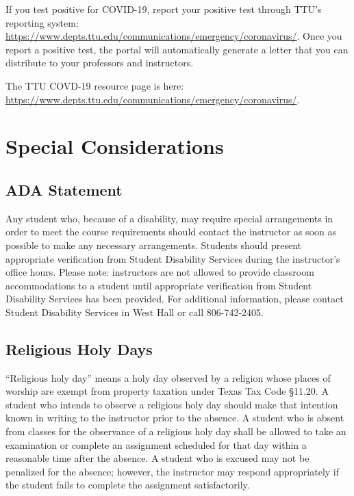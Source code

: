 \documentclass[12pt, notitlepage]{article}   	%
\begin{document}
{If you test positive for COVID-19, report your positive test through TTU's reporting system: 
\url{https://www.depts.ttu.edu/communications/emergency/coronavirus/}. Once you report a positive 
test, the portal will automatically generate a letter that you can distribute to your 
professors and instructors.

The TTU COVD-19 resource page is here: \url{https://www.depts.ttu.edu/communications/emergency/coronavirus/}.

\section{Special Considerations}
\subsection{ADA Statement}
Any student who, because of a disability, may require special arrangements in order to 
meet the course requirements should contact the instructor as soon as possible to make 
any necessary arrangements. Students should present appropriate verification from Student 
Disability Services during the instructor's office hours. Please note: instructors are 
not allowed to provide classroom accommodations to a student until appropriate verification 
from Student Disability Services has been provided. For additional information, please 
contact Student Disability Services in West Hall or call 806-742-2405.

\subsection{Religious Holy Days}
“Religious holy day” means a holy day observed by a religion whose places of worship 
are exempt from property taxation under Texas Tax Code §11.20. 
A student who intends to observe a religious holy day should make that intention known 
in writing to the instructor prior to the absence. 
A student who is absent from classes for the observance of a religious holy day shall be 
allowed to take an examination or complete an assignment scheduled for that day within a 
reasonable time after the absence. 
A student who is excused may not be penalized for the absence; however, the instructor 
may respond appropriately if the student fails to complete the assignment satisfactorily.

}
\end{document}
